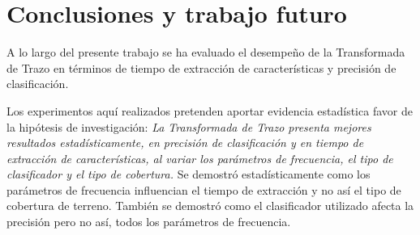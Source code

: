 \chapter{Conclusiones y trabajo futuro} 

A lo largo del presente trabajo se ha evaluado el desempeño de la Transformada de Trazo en términos de tiempo de extracción de características y precisión de clasificación. 

Los experimentos aquí realizados pretenden aportar evidencia estadística favor de la hipótesis de investigación:
\textit{La Transformada de Trazo presenta mejores resultados estadísticamente, en precisión de clasificación y en tiempo de extracción de características, al variar los parámetros de frecuencia, el tipo de clasificador y el tipo de cobertura.}
Se demostró estadísticamente como los parámetros de frecuencia influencian el tiempo de extracción y no así el tipo de cobertura de terreno. También se demostró como el clasificador utilizado afecta la precisión pero no así, todos los parámetros de frecuencia. 

